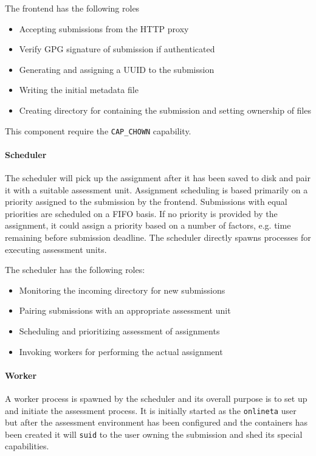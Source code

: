 The frontend has the following roles
\begin{itemize}
\item Accepting submissions from the HTTP proxy
\item Verify GPG signature of submission if authenticated
\item Generating and assigning a UUID to the submission
\item Writing the initial metadata file
\item Creating directory for containing the submission and setting
  ownership of files
\end{itemize}

This component require the \texttt{CAP\_CHOWN} capability.

\paragraph{Scheduler}
The scheduler will pick up the assignment after it has been saved to
disk and pair it with a suitable assessment unit. Assignment
scheduling is based primarily on a priority assigned to the submission
by the frontend. Submissions with equal priorities are scheduled on a
FIFO basis. If no priority is provided by the assignment, it could
assign a priority based on a number of factors, e.g. time remaining
before submission deadline. The scheduler directly spawns processes for
executing assessment units.

The scheduler has the following roles:
\begin{itemize}
\item Monitoring the incoming directory for new submissions
\item Pairing submissions with an appropriate assessment unit
\item Scheduling and prioritizing assessment of assignments
\item Invoking workers for performing the actual assignment
\end{itemize}

\paragraph{Worker}
A worker process is spawned by the scheduler and its overall purpose
is to set up and initiate the assessment process. It is initially
started as the \texttt{onlineta} user but after the assessment
environment has been configured and the containers has been created it
will \texttt{suid} to the user owning the submission and shed its special
capabilities.

